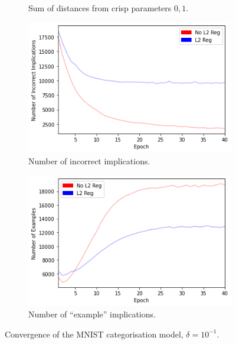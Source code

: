 \begin{figure}[H]
\begin{subfigure}[t]{0.45\textwidth}
        \caption{Sum of distances from crisp parameters $0,1$.}
        \label{fig:mnistcrispness}
    \end{subfigure}
    \begin{subfigure}[t]{0.45\textwidth}
        \centering
        \includegraphics[width=\textwidth]{imgs/mnist-unsatisfied.png}
        \caption{Number of incorrect implications.}
        \label{fig:mnistunsatisfied}
    \end{subfigure}
    \begin{subfigure}[t]{0.45\textwidth}
        \centering
        \includegraphics[width=\textwidth]{imgs/mnist-examples.png}
        \caption{Number of ``example'' implications.}
        \label{fig:mnistexamples}
    \end{subfigure}
       \caption{Convergence of the MNIST categorisation model, $\delta=10^{-1}$.}
       \label{fig:mnist}
\end{figure}

